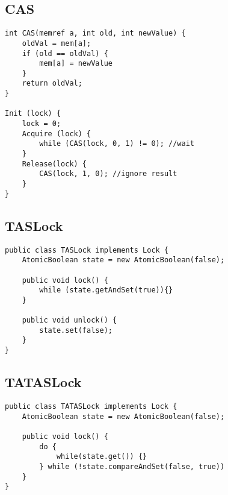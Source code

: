 \documentclass{article}
\begin{document}
\subsection{CAS}
\begin{lstlisting}[style=java]
int CAS(memref a, int old, int newValue) {
    oldVal = mem[a];
    if (old == oldVal) {
        mem[a] = newValue
    }
    return oldVal;
}

Init (lock) {
    lock = 0;
    Acquire (lock) {
        while (CAS(lock, 0, 1) != 0); //wait
    }
    Release(lock) {
        CAS(lock, 1, 0); //ignore result
    }
}
\end{lstlisting}

\subsection{TASLock}
\begin{lstlisting}[style=java]
public class TASLock implements Lock {
    AtomicBoolean state = new AtomicBoolean(false);

    public void lock() {
        while (state.getAndSet(true)){}
    }

    public void unlock() {
        state.set(false);
    }
}
\end{lstlisting}

\subsection{TATASLock}
\begin{lstlisting}[style=java]
public class TATASLock implements Lock {
    AtomicBoolean state = new AtomicBoolean(false);

    public void lock() {
        do {
            while(state.get()) {}
        } while (!state.compareAndSet(false, true))
    }
}
\end{lstlisting}
\end{document}
